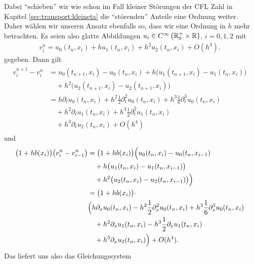 Dabei ``schieben'' wir wie schon im Fall kleiner Störungen der CFL Zahl in Kapitel \ref{sec:transport:kleineta} die ``störenden'' Anteile eine Ordnung weiter.
Daher wählen wir unseren Ansatz ebenfalls so, dass wir eine Ordnung in $h$ mehr betrachten.
Es seien also glatte Abbildungen $u_i \in C^{\infty}\left( \mathbb R^+_0 \times \mathbb R \right)$, $i = 0,1,2$ mit
\begin{align}
\label{eq:varadv:kleina:ansatz}
v^n_i = u_0(t_n, x_i) + h u_1(t_n, x_i) + h^2 u_2(t_n, x_i) + O(h^3).
\end{align}
gegeben.
Dann gilt
\begin{align}
\label{eq:varadv:kleina:diff1}
\begin{split}
v^{n+1}_i - v^n_i &= u_0(t_{n+1}, x_i) - u_0(t_n, x_i) + h \bigl( u_1(t_{n+1}, x_i) - u_1(t_n, x_i) \bigr)\\
&\quad + h^2 \bigl( u_2(t_{n+1}, x_i) - u_2(t_{n+1}, x_i) \bigr)\\
&=  h \partial_t u_0(t_n, x_i) + h^2 \frac{1}{2} \partial^2_t u_0(t_n, x_i) + h^3 \frac{1}{6} \partial^3_t u_0(t_n, x_i)\\
&\quad + h^2  \partial_t u_1(t_n, x_i) + h^3 \frac{1}{2} \partial^2_t u_1(t_n, x_i)\\
&\quad + h^3  \partial_t u_2(t_n, x_i) + O(h^4)
\end{split}
\end{align}
und
\begin{align}
\label{eq:varadv:kleina:diff2}
\begin{split}
\bigl( 1 + h b(x_i) \bigr)  \bigl( v^n_i - v^n_{i-1} \bigr) &= \bigl(1 + h b(x_i) \bigr) \Bigl( u_0(t_n, x_i) - u_0(t_n, x_{i-1})\\
&\quad + h \bigl( u_1(t_n, x_i) - u_1(t_n, x_{i-1}) \bigr)\\
&\quad + h^2 \bigl( u_2(t_n, x_i) - u_2(t_n, x_{i-1}) \bigr) \Bigr)\\
&= \bigl(1 + h b(x_i) \bigr) \cdot \\
&\Bigl( h \partial_x u_0(t_n, x_i) - h^2 \frac{1}{2} \partial^2_x u_0(t_n, x_i) + h^3 \frac{1}{6} \partial^3_x u_0(t_n, x_i)\\
&\quad + h^2 \partial_x u_1(t_n, x_i) - h^3 \frac{1}{2} \partial_x u_1(t_n, x_i)\\
&\quad + h^3 \partial_x u_2(t_n, x_i) \Bigr) + O(h^4).
\end{split}
\end{align}
Das liefert uns also das Gleichungssystem

